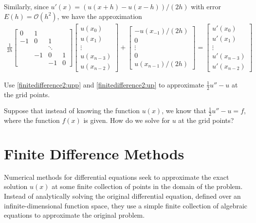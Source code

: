 Similarly, since  $u'(x) = (u(x+h) - u(x-h))/(2h)$ with error $E(h) = \mathcal{O}(h^2)$, we have the approximation
\begin{align}
\frac{1}{2h}
\begin{bmatrix}
0 & 1 & \\
-1 & 0 & 1  \\
& &\ddots & \\
 & -1 & 0 & 1 \\
 & & -1 & 0
\end{bmatrix}
\begin{bmatrix}
u(x_0) \\ u(x_1)\\ \vdots  \\ u(x_{n-3}) \\ u(x_{n-2})
\end{bmatrix} +
\begin{bmatrix}
-u(x_{-1})/(2h) \\ 0 \\ \vdots  \\ 0 \\ u(x_{n-1})/(2h)
\end{bmatrix} =
\begin{bmatrix}
u'(x_0) \\ u'(x_1)\\ \vdots  \\ u'(x_{n-3}) \\ u'(x_{n-2})
\end{bmatrix}\label{finitedifference2:up}
\end{align}

\begin{problem}
	Use \eqref{finitedifference2:upp} and \eqref{finitedifference2:up} to approximate $\frac{1}{2}u'' - u$ at the grid points.
\end{problem}

Suppose that instead of knowing the function $u(x)$, we know that $\frac{1}{2}u'' - u = f$, where the function $f(x)$ is given.
How do we solve for $u$ at the grid points?

\section*{Finite Difference Methods}

Numerical methods for differential equations seek to approximate the exact solution $u(x)$ at some finite collection of points in the domain of the problem.
Instead of analytically solving the original differential equation, defined over an infinite-dimensional function space, they use a simple finite collection of algebraic equations to approximate the original problem.


